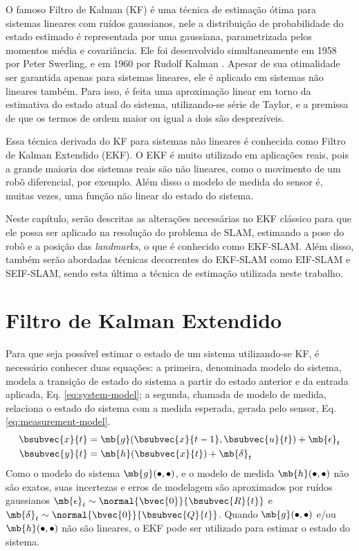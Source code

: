 O famoso Filtro de Kalman (KF) é uma técnica de estimação ótima para sistemas lineares com ruídos gaussianos, nele a distribuição de probabilidade do estado estimado é representada por uma gaussiana, parametrizada pelos momentos média e covariância. Ele foi desenvolvido simultaneamente em 1958 por Peter Swerling, e em 1960 por Rudolf Kalman \cite[p.~40]{bongard2006probabilistic}. Apesar de sua otimalidade ser garantida apenas para sistemas lineares, ele é aplicado em sistemas não lineares também. Para isso, é feita uma aproximação linear em torno da estimativa do estado atual do sistema, utilizando-se série de Taylor, e a premissa de que os termos de ordem maior ou igual a dois são desprezíveis.

Essa técnica derivada do KF para sistemas não lineares é conhecida como Filtro de Kalman Extendido (EKF). O EKF é muito utilizado em aplicações reais, pois a grande maioria dos sistemas reais são não lineares, como o movimento de um robô diferencial, por exemplo. Além disso o modelo de medida do sensor é, muitas vezes, uma função não linear do estado do sistema.

Neste capítulo, serão descritas as alterações necessárias no EKF clássico para que ele possa ser aplicado na resolução do problema de SLAM, estimando a pose do robô e a posição das \textit{landmarks}, o que é conhecido como EKF-SLAM. Além disso, também serão abordadas técnicas decorrentes do EKF-SLAM como EIF-SLAM e SEIF-SLAM, sendo esta última a técnica de estimação utilizada neste trabalho.

\section{Filtro de Kalman Extendido}
\label{sec:ekf}
Para que seja possível estimar o estado de um sistema utilizando-se KF, é 
necessário conhecer duas equações: a primeira, denominada modelo do sistema, 
modela a transição de estado do sistema a partir do estado anterior e da entrada aplicada, Eq. \ref{eq:system-model}; a segunda, chamada de modelo de medida, relaciona o estado do sistema com a medida esperada, gerada pelo sensor, Eq. \ref{eq:measurement-model}. 
\begin{align}
  \bsubvec{x}{t} &= \mb{g}(\bsubvec{x}{t-1}, \bsubvec{u}{t}) + \mb{\epsilon}_t
  \label{eq:system-model}\\
  \bsubvec{y}{t} &= \mb{h}(\bsubvec{x}{t}) + \mb{\delta}_t
  \label{eq:measurement-model}
\end{align}
Como o modelo do sistema $\mb{g}(\mathord{\bullet}, \mathord{\bullet})$, e o modelo de medida $\mb{h}(\mathord{\bullet}, \mathord{\bullet})$ não são exatos, suas incertezas e erros de modelagem são aproximados por ruídos gaussianos $\mb{\epsilon}_t \sim \normal{\bvec{0}}{\bsubvec{R}{t}}$ e $\mb{\delta}_t \sim \normal{\bvec{0}}{\bsubvec{Q}{t}}$. Quando $\mb{g}(\mathord{\bullet}, \mathord{\bullet})$ e/ou $\mb{h}(\mathord{\bullet}, \mathord{\bullet})$ não são lineares, o EKF pode ser utilizado para estimar o estado 
do sistema. 

